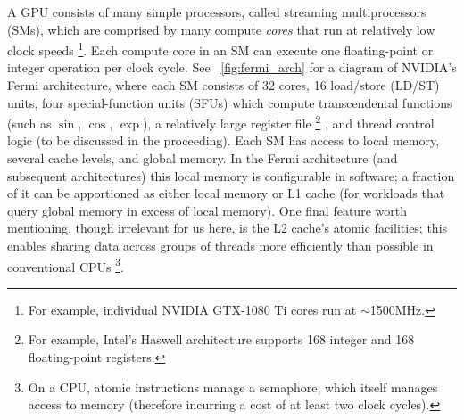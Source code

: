 \documentclass[sigconf]{acmart}
\begin{document}
A GPU consists of many simple processors, called streaming multiprocessors (SMs), which are comprised by many compute \textit{cores} that run at relatively low clock speeds%
\footnote{For example, individual NVIDIA GTX-1080 Ti cores run at $\sim$1500MHz.}.
Each compute core in an SM can execute one floating-point or integer operation per clock cycle.
See ~\cref{fig:fermi_arch} for a diagram of NVIDIA's Fermi architecture, where each SM consists of 32 cores, 16 load/store (LD/ST) units, four special-function units (SFUs) which compute transcendental functions (such as $\sin$, $\cos$, $\exp$), a relatively large register file%
\footnote{For example, Intel's Haswell architecture supports 168 integer and 168 floating-point registers.}%
, and thread control logic (to be discussed in the proceeding).
Each SM has access to local memory, several cache levels, and global memory.
In the Fermi architecture (and subsequent architectures) this local memory is configurable in software;
a fraction of it can be apportioned as either local memory or L1 cache (for workloads that query global memory in excess of local memory).
One final feature worth mentioning, though irrelevant for us here, is the L2 cache's atomic  facilities;
this enables sharing data across groups of threads more efficiently than possible in conventional CPUs%
\footnote{On a CPU, atomic  instructions manage a semaphore, which itself manages access to memory (therefore incurring a cost of at least two clock cycles).}.
\end{document}
